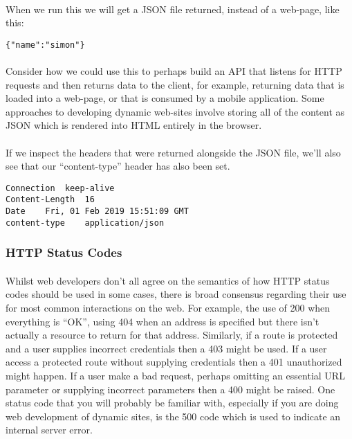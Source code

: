\documentclass[10pt, a4paper, twosize]{article}
\begin{document}
\paragraph{} When we run this we will get a JSON file returned, instead of a web-page, like this:
\begin{lstlisting}
{"name":"simon"}
\end{lstlisting}
\paragraph{} Consider how we could use this to perhaps build an API that listens for HTTP requests and then returns data to the client, for example, returning data that is loaded into a web-page, or that is consumed by a mobile application. Some approaches to developing dynamic web-sites involve storing all of the content as JSON which is rendered into HTML entirely in the browser.

\paragraph{} If we inspect the headers that were returned alongside the JSON file, we'll also see that our ``content-type'' header has also been set.

\begin{lstlisting}
Connection	keep-alive
Content-Length	16
Date	Fri, 01 Feb 2019 15:51:09 GMT
content-type	application/json
\end{lstlisting}


\subsubsection{HTTP Status Codes}
\paragraph{} Whilst web developers don't all agree on the semantics of how HTTP status codes should be used in some cases, there is broad consensus regarding their use for most common interactions on the web. For example, the use of 200 when everything is ``OK'', using 404 when an address is specified but there isn't actually a resource to return for that address. Similarly, if a route is protected and a user supplies incorrect credentials then a 403 might be used. If a user access a protected route without supplying credentials then a 401 unauthorized might happen. If a user make a bad request, perhaps omitting an essential URL parameter or supplying incorrect parameters then a 400 might be raised. One status code that you will probably be familiar with, especially if you are doing web development of dynamic sites, is the 500 code which is used to indicate an internal server error.
\end{document}
